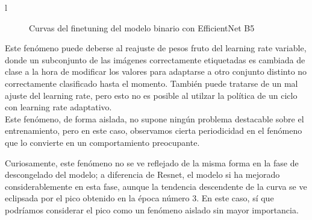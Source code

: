 l\begin{figure}[H]
	\centering
	\caption{Curvas del finetuning del modelo binario con EfficientNet B5}
	\label{fig:curvasefnetbinaria}
\end{figure}

Este fenómeno puede deberse al reajuste de pesos fruto del learning rate variable, donde un subconjunto de las imágenes correctamente etiquetadas es cambiada de clase a la hora de modificar los valores para adaptarse a otro conjunto distinto no correctamente clasificado hasta el momento. También puede tratarse de un mal ajuste del learning rate, pero esto no es posible al utilzar la política de un ciclo con learning rate adaptativo.\\

Este fenómeno, de forma aislada, no supone ningún problema destacable sobre el entrenamiento, pero en este caso, observamos  cierta periodicidad en el fenómeno que lo convierte en un comportamiento preocupante.

Curiosamente, este fenómeno no se ve reflejado de la misma forma en la fase de descongelado del modelo; a diferencia de Resnet, el modelo si ha mejorado considerablemente en esta fase, aunque la tendencia descendente de la curva se ve eclipsada por el pico obtenido en la época número 3. En este caso, sí que podríamos considerar el pico como un fenómeno aislado sin mayor importancia.

